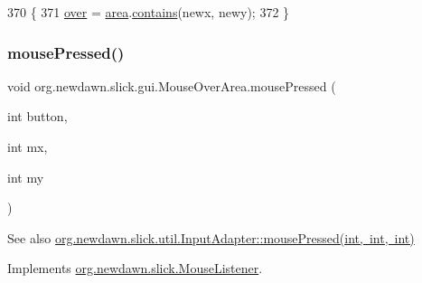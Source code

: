 \begin{DoxyCode}
370                                                                    \{
371         \mbox{\hyperlink{classorg_1_1newdawn_1_1slick_1_1gui_1_1_mouse_over_area_ac71b080e2b87f755f6e0fb54983877b1}{over}} = \mbox{\hyperlink{classorg_1_1newdawn_1_1slick_1_1gui_1_1_mouse_over_area_a8104ad89fbe457da294da3285b7a3268}{area}}.\mbox{\hyperlink{classorg_1_1newdawn_1_1slick_1_1geom_1_1_shape_ae9dcbe23fb1bcd01bac0ddcfe09685de}{contains}}(newx, newy);
372     \}
\end{DoxyCode}
\mbox{\label{classorg_1_1newdawn_1_1slick_1_1gui_1_1_mouse_over_area_a5d0f752e776cba0ca2a7a651236d6853}} 
\subsubsection{\texorpdfstring{mouse\+Pressed()}{mousePressed()}}
{\footnotesize\ttfamily void org.\+newdawn.\+slick.\+gui.\+Mouse\+Over\+Area.\+mouse\+Pressed (\begin{DoxyParamCaption}\item[{int}]{button,  }\item[{int}]{mx,  }\item[{int}]{my }\end{DoxyParamCaption})\hspace{0.3cm}{\ttfamily [inline]}}

\begin{DoxySeeAlso}{See also}
\mbox{\hyperlink{classorg_1_1newdawn_1_1slick_1_1util_1_1_input_adapter_a8c466a6d0e2479d535aa5f435fcc684d}{org.\+newdawn.\+slick.\+util.\+Input\+Adapter\+::mouse\+Pressed(int, int, int)}} 
\end{DoxySeeAlso}


Implements \mbox{\hyperlink{interfaceorg_1_1newdawn_1_1slick_1_1_mouse_listener_aeca4c21a38aa31c408f3daf6f86c0925}{org.\+newdawn.\+slick.\+Mouse\+Listener}}.


